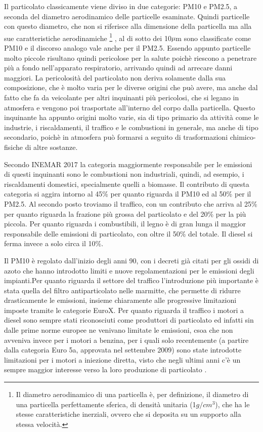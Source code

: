 \documentclass[a4paper,12pt]{report}
\begin{document}
Il particolato classicamente viene diviso in due categorie: PM10 e PM2.5, a seconda del diametro aerodinamico delle particelle esaminate. Quindi particelle con questo diametro, che non si riferisce alla dimensione della particella ma alla sue caratteristiche aerodinamiche
\footnote{Il diametro aerodinamico di una particella è, per definizione, il diametro di una particella perfettamente sferica, di densità unitaria (1$g/cm^3$), che ha le stesse caratteristiche inerziali, ovvero che si deposita su un supporto alla stessa velocità.}
, al di sotto dei 10$\mu$m sono classificate come PM10 e il discorso analogo vale anche per il PM2.5. Essendo appunto particelle molto piccole risultano quindi pericolose per la salute poichè riescono a penetrare più a fondo nell'apparato respiratorio, arrivando quindi ad arrecare danni maggiori. La pericolosità del particolato non deriva solamente dalla sua composizione, che è molto varia per le diverse origini che può avere, ma anche dal fatto che fa da veicolante per altri inquinanti più pericolosi, che si legano in atmosfera e vengono poi trasportate all'interno del corpo dalla particella. Questo inquinante ha appunto origini molto varie, sia di tipo primario da attività come le industrie, i riscaldamenti, il traffico e le combustioni in generale, ma anche di tipo secondario, poichè in atmosfera può formarsi a seguito di trasformazioni chimico-fisiche di altre sostanze.

Secondo INEMAR 2017 \cite{inemar2017}
 la categoria maggiormente responsabile per le emissioni di questi inquinanti sono le combustioni non industriali, quindi, ad esempio, i riscaldamenti domestici, specialmente quelli a biomasse. Il contributo di questa categoria si aggira intorno al 45\% per quanto riguarda il PM10 ed al 50\% per il PM2.5. Al secondo posto troviamo il traffico, con un contributo che arriva al 25\% per quanto riguarda la frazione più grossa del particolato e del 20\% per la più piccola. Per quanto riguarda i combustibili, il legno è di gran lunga il maggior responsabile delle emissioni di particolato, con oltre il 50\% del totale. Il diesel si ferma invece a solo circa il 10\%.

Il PM10 è regolato dall'inizio degli anni 90, con i decreti già citati per gli ossidi di azoto che hanno introdotto limiti e nuove regolamentazioni per le emissioni degli impianti.Per quanto riguarda il settore del traffico l'introduzione più importante è stata quella del filtro antiparticolato nelle marmitte, che permette di ridurre drasticamente le emissioni, insieme chiaramente alle progressive limitazioni imposte tramite le categorie EuroX. 
Per quanto riguarda il traffico i motori a diesel sono sempre stati riconosciuti come produttori di particolato ed infatti sin dalle prime norme europee ne venivano limitate le emissioni, csoa che non avveniva invece per i motori a benzina, per i quali solo recentemente (a partire dalla categoria Euro 5a, approvata nel settembre 2009) sono state introdotte limitazioni per i motori a iniezione diretta, visto che negli ultimi anni c'è un sempre maggior interesse verso la loro produzione di particolato  \cite{Raza_2018}. 
\end{document}
